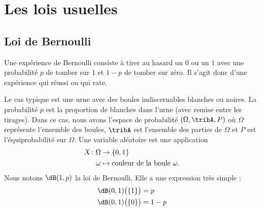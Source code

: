 
\section{Les lois usuelles}

\subsection{Loi de Bernoulli}

Une expérience de Bernoulli consiste à tirer au hasard un \( 0\) ou un \( 1\) avec une probabilité \( p\) de tomber sur \( 1\) et \( 1-p\) de tomber sur zéro. Il s'agit donc d'une expérience qui réussi ou qui rate.

Le cas typique est une urne avec des boules indiscernables blanches ou noires. La probabilité \( p\) est la proportion de blanches dans l'urne (avec remise entre les tirages). Dans ce cas, nous avons l'espace de probabilité \( (\Omega,\tribA,P)\) où \( \Omega\) représente l'ensemble des boules, \( \tribA\) est l'ensemble des parties de \( \Omega\) et \( P\) est l'équiprobabilité sur \( \Omega\). Une variable aléatoire est une application
\begin{equation}
    \begin{aligned}
        X\colon \Omega&\to \{ 0,1 \} \\
        \omega&\mapsto \text{couleur de la boule \( \omega\)}.
    \end{aligned}
\end{equation}
Nous notons \( \dB(1,p)\) la loi de Bernoulli. Elle a une expression très simple :
\begin{subequations}
    \begin{align}
        \dB(0,1)\big( \{ 1 \} \big)&=p\\
        \dB(0,1)\big( \{ 0 \} \big)&=1-p
    \end{align}
\end{subequations}

